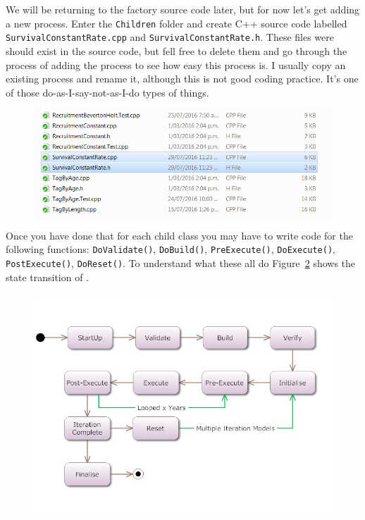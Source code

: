 We will be returning to the factory source code later, but for now let's get adding a new process. Enter the \texttt{Children} folder and create C++ source code labelled \texttt{SurvivalConstantRate.cpp} and \texttt{SurvivalConstantRate.h}. These files were should exist in the source code, but fell free to delete them and go through the process of adding the process to see how easy this process is. I usually copy an existing process and rename it, although this is not good coding practice. It's one of those do-as-I-say-not-as-I-do types of things.
\begin{figure}[!ht]
	\centering
	\includegraphics[scale=0.6]{Figures/add_survival.png}
	\caption{}\label{fig:process2}
\end{figure}

Once you have done that for each child class you may have to write code for the following functions{\color{red}:} \texttt{DoValidate()}, \texttt{DoBuild()}, \texttt{PreExecute()}, \texttt{DoExecute()}, \texttt{PostExecute()}, \texttt{DoReset()}. To understand what these all do Figure~\ref{fig:flow} shows the state transition of \CNAME.
\raggedbottom
\begin{figure}[!ht]
	\centering
	\includegraphics[scale=0.6]{Figures/State-Transition.png}
	\caption{}\label{fig:flow}
\end{figure}

